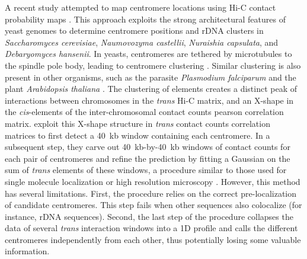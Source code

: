 A recent study attempted to map centromere locations using Hi-C contact
probability maps \citep{marie-nelly:filling}. This approach exploits the
strong architectural features of yeast genomes to determine centromere
positions and rDNA clusters in \textit{Saccharomyces cerevisiae},
\textit{Naumovozyma castellii}, \textit{Nuraishia capsulata}, and
\textit{Debaryomyces hansenii}. 
In yeasts, centromeres are tethered by microtubules to the spindle
pole body, leading to centromere clustering \citep{mizuguchi:cohesin}.
Similar clustering is also present in other organisms, such as the
parasite \textit{Plasmodium falciparum} and the plant
\textit{Arabidopsis thaliana} \citep{ay:three-dimensional,
  feng:genome-wide}.
The clustering of elements creates a
distinct peak of interactions between chromosomes in the \textit{trans} Hi-C
matrix, and an X-shape in the \textit{cis}-elements of the inter-chromosomal
contact counts pearson correlation matrix.
\citet{marie-nelly:filling} exploit this
X-shape structure in \textit{trans} contact counts correlation
matrices to first detect a 40~kb window containing each centromere.
In a subsequent step,
they carve out 40~kb-by-40~kb windows of contact counts
for each pair of centromeres and refine
the prediction by fitting a Gaussian on the sum of \textit{trans} elements of
these windows, a procedure similar to those used for single molecule
localization or high resolution microscopy \citep{Ober:localization}. However,
this method has several limitations. First, the procedure relies on the
correct pre-localization of candidate centromeres. This step fails when other
sequences also colocalize (for instance, rDNA sequences). Second, the last
step of the procedure collapses the data of several \textit{trans} interaction
windows into a 1D profile and calls the different centromeres independently
from each other, thus potentially losing some valuable information.

